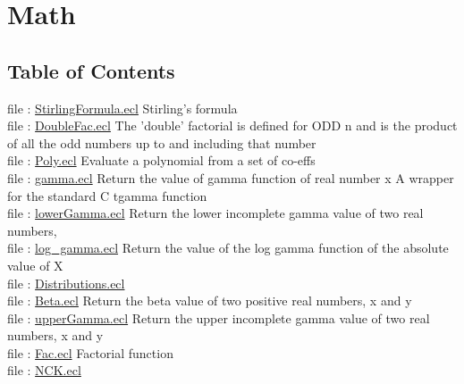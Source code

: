 \chapter*{Math}
\hypertarget{ecldoc:toc:ML_Core/Math}{}


\section*{Table of Contents}
file : \hyperlink{ecldoc:toc:ML_Core.Math.StirlingFormula}{StirlingFormula.ecl}  Stirling's formula \\
file : \hyperlink{ecldoc:toc:ML_Core.Math.DoubleFac}{DoubleFac.ecl}  The 'double' factorial is defined for ODD n and is the product of all the odd numbers up to and including that number \\
file : \hyperlink{ecldoc:toc:ML_Core.Math.Poly}{Poly.ecl}  Evaluate a polynomial from a set of co-effs \\
file : \hyperlink{ecldoc:toc:ML_Core.Math.gamma}{gamma.ecl}  Return the value of gamma function of real number x A wrapper for the standard C tgamma function \\
file : \hyperlink{ecldoc:toc:ML_Core.Math.lowerGamma}{lowerGamma.ecl}  Return the lower incomplete gamma value of two real numbers, \\
file : \hyperlink{ecldoc:toc:ML_Core.Math.log_gamma}{log\_gamma.ecl}  Return the value of the log gamma function of the absolute value of X \\
file : \hyperlink{ecldoc:toc:ML_Core.Math.Distributions}{Distributions.ecl}   \\
file : \hyperlink{ecldoc:toc:ML_Core.Math.Beta}{Beta.ecl}  Return the beta value of two positive real numbers, x and y \\
file : \hyperlink{ecldoc:toc:ML_Core.Math.upperGamma}{upperGamma.ecl}  Return the upper incomplete gamma value of two real numbers, x and y \\
file : \hyperlink{ecldoc:toc:ML_Core.Math.Fac}{Fac.ecl}  Factorial function \\
file : \hyperlink{ecldoc:toc:ML_Core.Math.NCK}{NCK.ecl}   \\












